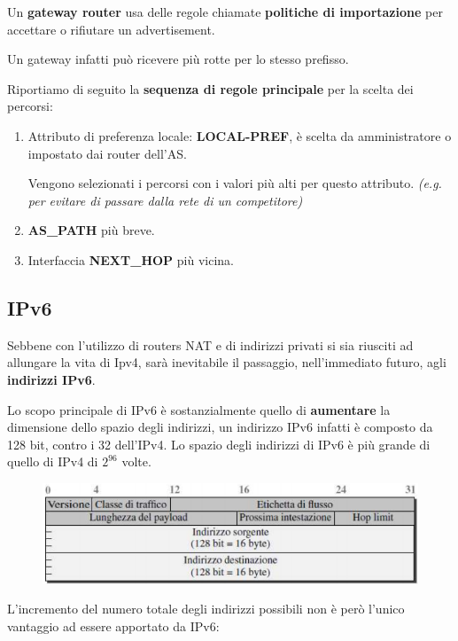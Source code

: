 \documentclass[11pt,a4paper,oneside]{book}
\theoremstyle{definition}
\begin{document}
Un \textbf{gateway router} usa delle regole chiamate \textbf{politiche di importazione} per accettare o rifiutare un advertisement.

Un gateway infatti può ricevere più rotte per lo stesso prefisso.

Riportiamo di seguito la \textbf{sequenza di regole principale} per la scelta dei percorsi:

\begin{enumerate}
	\item Attributo di preferenza locale: \textbf{LOCAL-PREF}, è scelta da
	      amministratore o impostato dai router dell’AS.

	      Vengono
	      selezionati i percorsi con i valori più alti per questo attributo. \textit{(e.g. per evitare di passare dalla rete di un competitore)}
	\item \textbf{ AS\_PATH} più breve.
	\item Interfaccia \textbf{NEXT\_HOP} più vicina.
\end{enumerate}

\pagebreak

\subsection{IPv6}

Sebbene con l'utilizzo di routers NAT e di indirizzi privati si sia riusciti ad allungare la vita di Ipv4, sarà inevitabile il passaggio, nell'immediato futuro, agli \textbf{indirizzi IPv6}.

Lo scopo principale di IPv6 è sostanzialmente quello di \textbf{aumentare} la dimensione dello spazio degli indirizzi, un indirizzo IPv6 infatti è composto da 128 bit, contro i 32 dell'IPv4. Lo spazio degli indirizzi di IPv6 è più grande di quello di IPv4 di $2^{96}$ volte.

\begin{figure}[!h]
	\centering
	\includegraphics[scale=0.45]{Immagini/IPv6.png}
\end{figure}

L'incremento del numero totale degli indirizzi possibili non è però l'unico vantaggio ad essere apportato da IPv6:
\end{document}
